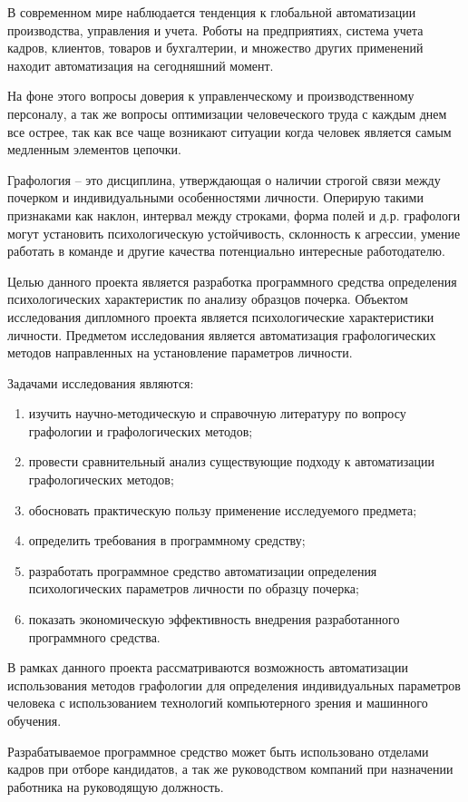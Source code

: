 \label{sec:intro}

В современном мире наблюдается тенденция к глобальной автоматизации производства, управления и учета. Роботы на предприятиях, система учета кадров, клиентов, товаров и бухгалтерии, и множество других применений находит автоматизация на сегодняшний момент.

На фоне этого вопросы доверия к управленческому и производственному персоналу, а так же вопросы оптимизации человеческого труда с каждым днем все острее, так как все чаще возникают ситуации когда человек
является самым медленным элементов цепочки.

Графология – это дисциплина, утверждающая о наличии строгой связи между почерком и индивидуальными особенностями личности. Оперирую такими признаками как наклон, интервал между строками, форма полей и д.р. графологи могут установить психологическую устойчивость, склонность к агрессии, умение работать в команде и другие качества потенциально интересные работодателю.

Целью данного проекта является разработка программного средства определения психологических характеристик по анализу образцов почерка.  
Объектом исследования дипломного проекта является психологические характеристики личности.
Предметом исследования является автоматизация графологических методов направленных на установление параметров личности.

Задачами исследования являются:
\begin{enumerate}
  \item изучить научно-методическую и справочную литературу по вопросу графологии и графологических методов;
  \item провести сравнительный анализ существующие подходу к автоматизации графологических методов;
  \item обосновать практическую пользу применение исследуемого предмета;
  \item определить требования в программному средству;
  \item разработать программное средство автоматизации определения психологических параметров личности по образцу почерка;
  \item показать экономическую эффективность внедрения разработанного программного средства.
\end{enumerate}

В рамках данного проекта рассматриваются возможность автоматизации использования методов графологии для определения индивидуальных параметров человека с использованием технологий компьютерного зрения и машинного обучения.

Разрабатываемое программное средство может быть использовано отделами кадров при отборе кандидатов, а так же руководством компаний при назначении работника на руководящую должность.
